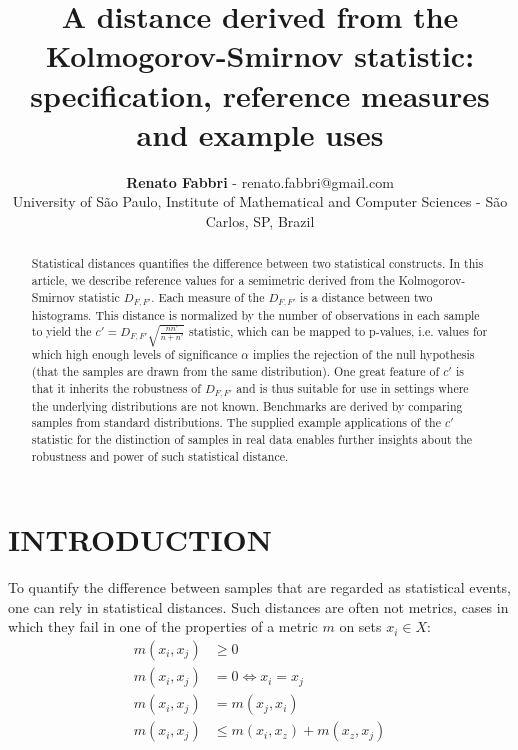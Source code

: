 \documentclass[12pt,fleqn]{article}
\title{A distance derived from the Kolmogorov-Smirnov statistic:
	specification, reference measures and example uses}
\author
    {\rm \begin{tabular}{l} 
    \textbf{Renato Fabbri}$$ - {\textnormal renato.fabbri@gmail.com}\\%
    {\fontsize{11}{0}\selectfont University of São Paulo, Institute of Mathematical and Computer Sciences - São Carlos, SP, Brazil}\vspace*{-0.05cm} \\
  \end{tabular}}
\renewcommand{\headrulewidth}{0.0pt}
\begin{document}
\maketitle

\thispagestyle{firspagetstyle}

\renewcommand{\headrulewidth}{0.0pt}
\rhead{}

\begin{abstract}
Statistical distances quantifies the difference between two statistical constructs.
In this article, we describe reference values for a semimetric
derived from the Kolmogorov-Smirnov statistic $D_{F,F'}$.
Each measure of the $D_{F,F'}$ is a distance between two histograms.
This distance is normalized by the number of observations in each sample
to yield the $c'=D_{F,F'}\sqrt{\frac{n n'}{n+n'}}$ statistic,
which can be mapped to p-values, i.e. values for which 
high enough levels of significance $\alpha$ implies the rejection of the
	null hypothesis (that the samples are drawn from the same distribution).
One great feature of $c'$ is that it inherits the robustness of
	$D_{F,F'}$ and is thus suitable for use in settings where
	the underlying distributions are not known.
Benchmarks are derived by comparing samples from standard distributions.
The supplied example applications of the $c'$ statistic for the distinction
	of samples in real data enables further
insights about the robustness and power of such statistical distance.
\end{abstract}


\pagestyle{fancy}

\section{INTRODUCTION}\label{sec:intro}
To quantify the difference between samples that are regarded as statistical events,
one can rely in statistical distances.
Such distances are often not metrics, cases in which they fail in one of
the properties of a metric $m$ on sets $x_i \in X$:
\begin{align}
	m(x_i,x_j) &  \geq 0 \\
	m(x_i,x_j) &  = 0 \Leftrightarrow x_i = x_j \\
	m(x_i,x_j) &  = m(x_j,x_i)\\
	m(x_i,x_j) &  \leq m(x_i,x_z) + m(x_z,x_j)
\end{align}
\end{document}
